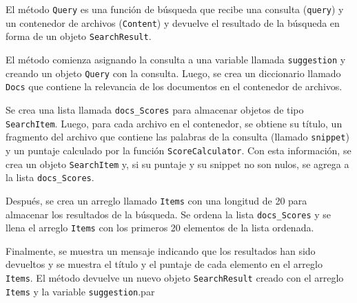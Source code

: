 \documentclass[12pt,a4paper]{report}
\begin{document}
El método \texttt{Query} es una función de búsqueda que recibe una consulta (\texttt{query}) y un contenedor de archivos (\texttt{Content}) y devuelve el resultado de la búsqueda en forma de un objeto \texttt{SearchResult}. 

El método comienza asignando la consulta a una variable llamada \texttt{suggestion} y creando un objeto \texttt{Query} con la consulta. Luego, se crea un diccionario llamado \texttt{Docs} que contiene la relevancia de los documentos en el contenedor de archivos.

Se crea una lista llamada \texttt{docs\_Scores} para almacenar objetos de tipo \texttt{SearchItem}. Luego, para cada archivo en el contenedor, se obtiene su título, un fragmento del archivo que contiene las palabras de la consulta (llamado \texttt{snippet}) y un puntaje calculado por la función \texttt{ScoreCalculator}. Con esta información, se crea un objeto \texttt{SearchItem} y, si su puntaje y su snippet no son nulos, se agrega a la lista \texttt{docs\_Scores}.\par

Después, se crea un arreglo llamado \texttt{Items} con una longitud de 20 para almacenar los resultados de la búsqueda. Se ordena la lista \texttt{docs\_Scores} y se llena el arreglo \texttt{Items} con los primeros 20 elementos de la lista ordenada.\par

Finalmente, se muestra un mensaje indicando que los resultados han sido devueltos y se muestra el título y el puntaje de cada elemento en el arreglo \texttt{Items}. El método devuelve un nuevo objeto \texttt{SearchResult} creado con el arreglo \texttt{Items} y la variable \texttt{suggestion}.par\
\end{document}
